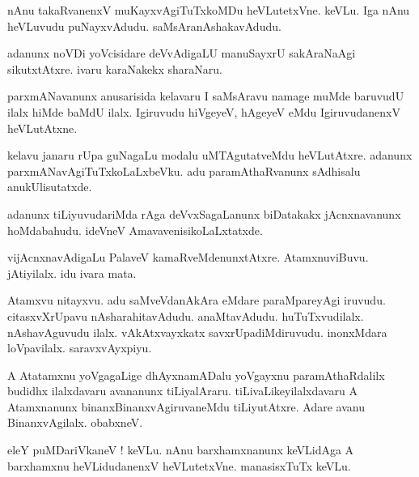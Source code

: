 \documentclass{article}
\begin{document}
\begin{mn}%
nAnu takaRvanenxV muKayxvAgiTuTxkoMDu heVLutetxVne. keVLu. Iga nAnu heVLuvudu puNayxvAdudu. 
saMsAranAshakavAdudu.
\end{mn}

\begin{mn}%
adanunx noVDi yoVcisidare deVvAdigaLU manuSayxrU sakAraNaAgi sikutxtAtxre. ivaru karaNakekx sharaNaru.
\end{mn}

\begin{mn}%
parxmANavanunx anusarisida kelavaru I saMsAravu namage muMde baruvudU ilalx hiMde baMdU ilalx. 
Igiruvudu hiVgeyeV, hAgeyeV eMdu IgiruvudanenxV heVLutAtxne.
\end{mn}

\begin{mn}%
kelavu janaru rUpa guNagaLu modalu uMTAgutatveMdu heVLutAtxre. adanunx parxmANavAgiTuTxkoLaLxbeVku. 
adu paramAthaRvanunx sAdhisalu anukUlisutatxde.
\end{mn}

\begin{mn}%
adanunx tiLiyuvudariMda rAga deVvxSagaLanunx biDatakakx jAcnxnavanunx hoMdabahudu. ideVneV 
AmavavenisikoLaLxtatxde.
\end{mn}

\begin{mn}%
vijAcnxnavAdigaLu PalaveV kamaRveMdenunxtAtxre. AtamxnuviBuvu. jAtiyilalx. idu ivara mata.
\end{mn}

\begin{mn}%
Atamxvu nitayxvu. adu saMveVdanAkAra eMdare paraMpareyAgi iruvudu. citasxvXrUpavu 
nAsharahitavAdudu. anaMtavAdudu. huTuTxvudilalx. nAshavAguvudu ilalx. vAkAtxvayxkatx 
savxrUpadiMdiruvudu. inonxMdara loVpavilalx. saravxvAyxpiyu.
\end{mn}

\begin{mn}%
A Atatamxnu yoVgagaLige dhAyxnamADalu yoVgayxnu paramAthaRdalilx budidhx ilalxdavaru avananunx 
tiLiyalAraru. tiLivaLikeyilalxdavaru A Atamxnanunx binanxBinanxvAgiruvaneMdu tiLiyutAtxre. Adare 
avanu BinanxvAgilalx. obabxneV.
\end{mn}

\begin{mn}%
eleY puMDariVkaneV ! keVLu. nAnu barxhamxnanunx keVLidAga A barxhamxnu heVLidudanenxV heVLutetxVne. 
manasisxTuTx keVLu.
\end{mn}
\end{document}
